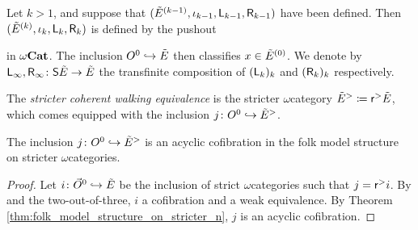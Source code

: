 \begin{dfn}
    Let \( k > 1 \), and suppose that \( (\tilde E^{(k - 1)}, \iota_{k - 1}, \mathsf{L}_{k - 1}, \mathsf{R}_{k - 1}) \) have been defined.
    Then \( (\tilde E^{(k)}, \iota_{k}, \mathsf{L}_{k}, \mathsf{R}_{k}) \) is defined by the pushout
    \begin{center}
    \end{center}
    in \( {\omega\mathbf{Cat}} \).
    The inclusion \( O^{0} \hookrightarrow \tilde E \) then classifies \( x \in \tilde E^{(0)} \).
    We denote by \( \mathsf{L}_\infty, \mathsf{R}_\infty \colon \mathsf{S}{\tilde E} \to \tilde E \) the transfinite composition of \( (\mathsf{L}_k)_k \) and \( (\mathsf{R}_k)_k \) respectively.
\end{dfn}


\begin{dfn} 
    The \emph{stricter coherent walking equivalence} is the stricter \( \omega \)\nbd category \( \tilde E^> \coloneqq \mathsf{r}^{>} \tilde E \), which comes equipped with the inclusion \( j \colon O^{0} \hookrightarrow \tilde E^> \).
\end{dfn}

\begin{lem} \label{lem:inclusion_into_stricter_is_equivalence}
    The inclusion \( j \colon O^{0} \hookrightarrow \tilde E^> \) is an acyclic cofibration in the folk model structure on stricter \( \omega \)\nbd categories.
\end{lem}
\begin{proof}
    Let \( i \colon \vec{O}^{0} \hookrightarrow \tilde E \) be the inclusion of strict \( \omega \)\nbd categories such that \( j = \mathsf{r}^{>} i \).
    By \cite[Remark 1.29, Theorem 1.33]{hadzihasanovic2024model} and the two-out-of-three, \( i \) a cofibration and a weak equivalence.
    By Theorem \ref{thm:folk_model_structure_on_stricter_n}, \( j \) is an acyclic cofibration. 
\end{proof}

